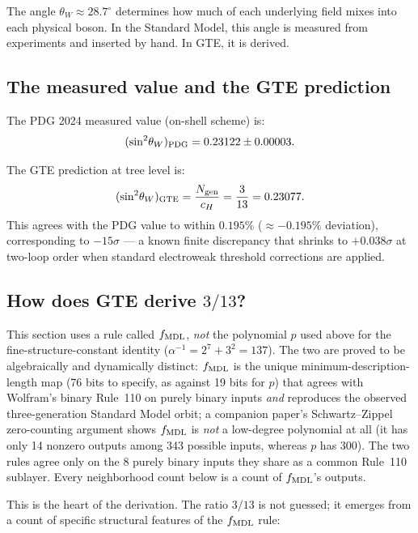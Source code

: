 \documentclass[11pt,a4paper]{article}
\newcommand{\sinwsq}{\sin^2\!\theta_W}
\newcommand{\Ngen}{N_{\rm gen}}
\newcommand{\cH}{c_H}
\begin{document}
\bigskip
\noindent
The angle $\theta_W \approx 28.7^\circ$ determines how much of each underlying field
mixes into each physical boson.  In the Standard Model, this angle is measured
from experiments and inserted by hand.  In GTE, it is derived.

\subsection{The measured value and the GTE prediction}

The PDG 2024 measured value (on-shell scheme) is:
\[
  (\sinwsq)_{\rm PDG} = 0.23122 \pm 0.00003.
\]

The GTE prediction at tree level is:
\[
  (\sinwsq)_{\rm GTE} = \frac{\Ngen}{\cH} = \frac{3}{13} = 0.23077.
\]
This agrees with the PDG value to within $0.195\%$
($\approx -0.195\%$ deviation), corresponding to $-15\sigma$ --- a known
finite discrepancy that shrinks to $+0.038\sigma$ at two-loop order when
standard electroweak threshold corrections are applied.

\subsection{How does GTE derive $3/13$?}

\begin{tcolorbox}[colback=black!5,colframe=black!50,
  title=\textbf{A note on which rule is used here}]
This section uses a rule called $f_{\rm MDL}$, \emph{not} the polynomial $p$
used above for the fine-structure-constant identity ($\alpha^{-1}=2^7+3^2=137$).
The
two are proved to be algebraically and dynamically distinct: $f_{\rm MDL}$ is
the unique minimum-description-length map (76 bits to specify, as against
19 bits for $p$) that agrees with Wolfram's binary Rule~110 on purely binary
inputs \emph{and} reproduces the observed three-generation Standard Model
orbit; a companion paper's Schwartz--Zippel zero-counting argument shows
$f_{\rm MDL}$ is \emph{not} a low-degree polynomial at all (it has only 14
nonzero outputs among 343 possible inputs, whereas $p$ has 300). The two rules
agree only on the 8 purely binary inputs they share as a common Rule~110
sublayer. Every neighborhood count below is a count of $f_{\rm MDL}$'s
outputs.
\end{tcolorbox}

This is the heart of the derivation.  The ratio $3/13$ is not guessed; it
emerges from a count of specific structural features of the $f_{\rm MDL}$ rule:
\end{document}
